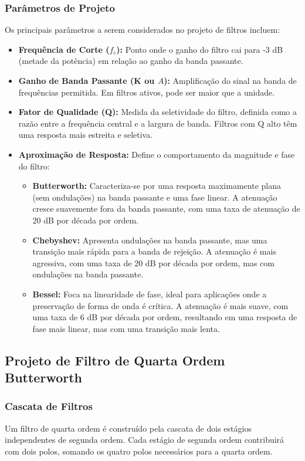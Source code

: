 \subsubsection{Parâmetros de Projeto}
Os principais parâmetros a serem considerados no projeto de filtros incluem:
\begin{itemize}
    \item \textbf{Frequência de Corte ($f_c$):} Ponto onde o ganho do filtro cai para -3 dB (metade da potência) em relação ao ganho da banda passante.
    \item \textbf{Ganho de Banda Passante (K ou $A$):} Amplificação do sinal na banda de frequências permitida. Em filtros ativos, pode ser maior que a unidade.
    \item \textbf{Fator de Qualidade (Q):} Medida da seletividade do filtro, definida como a razão entre a frequência central e a largura de banda. Filtros com Q alto têm uma resposta mais estreita e seletiva.
    \item \textbf{Aproximação de Resposta:} Define o comportamento da magnitude e fase do filtro:
    \begin{itemize}
        \item \textbf{Butterworth:} Caracteriza-se por uma resposta maximamente plana (sem ondulações) na banda passante e uma fase linear. A atenuação cresce suavemente fora da banda passante, com uma taxa de atenuação de 20 dB por década por ordem.
        \item \textbf{Chebyshev:} Apresenta ondulações na banda passante, mas uma transição mais rápida para a banda de rejeição. A atenuação é mais agressiva, com uma taxa de 20 dB por década por ordem, mas com ondulações na banda passante.
        \item \textbf{Bessel:} Foca na linearidade de fase, ideal para aplicações onde a preservação de forma de onda é crítica. A atenuação é mais suave, com uma taxa de 6 dB por década por ordem, resultando em uma resposta de fase mais linear, mas com uma transição mais lenta.
    \end{itemize}
\end{itemize}

\subsection{Projeto de Filtro de Quarta Ordem Butterworth}

\subsubsection{Cascata de Filtros}
Um filtro de quarta ordem é construído pela cascata de dois estágios independentes de segunda ordem. Cada estágio de segunda ordem contribuirá com dois polos, somando os quatro polos necessários para a quarta ordem.

